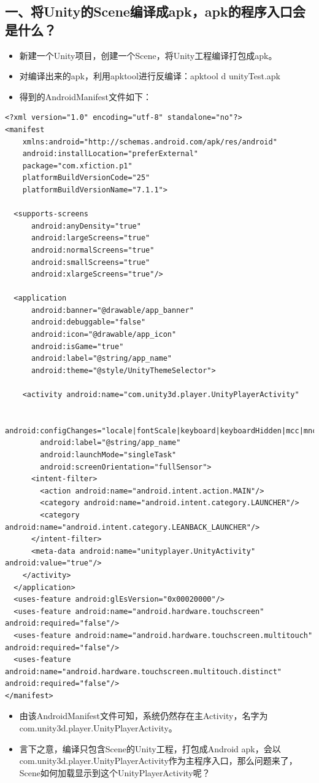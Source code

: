 \documentclass[9pt, b5paper]{article}
\begin{document}
\subsection{一、将Unity的Scene编译成apk，apk的程序入口会是什么？}
\label{sec-2-1}
\begin{itemize}
\item 新建一个Unity项目，创建一个Scene，将Unity工程编译打包成apk。
\item 对编译出来的apk，利用apktool进行反编译：apktool d unityTest.apk
\item 得到的AndroidManifest文件如下：
\end{itemize}
\begin{verbatim}
<?xml version="1.0" encoding="utf-8" standalone="no"?>
<manifest
    xmlns:android="http://schemas.android.com/apk/res/android"
    android:installLocation="preferExternal"
    package="com.xfiction.p1"
    platformBuildVersionCode="25"
    platformBuildVersionName="7.1.1">

  <supports-screens
      android:anyDensity="true"
      android:largeScreens="true"
      android:normalScreens="true"
      android:smallScreens="true"
      android:xlargeScreens="true"/>

  <application
      android:banner="@drawable/app_banner"
      android:debuggable="false"
      android:icon="@drawable/app_icon"
      android:isGame="true"
      android:label="@string/app_name"
      android:theme="@style/UnityThemeSelector">

    <activity android:name="com.unity3d.player.UnityPlayerActivity" 

        android:configChanges="locale|fontScale|keyboard|keyboardHidden|mcc|mnc|navigation|orientation|screenLayout|screenSize|smallestScreenSize|touchscreen|uiMode"
        android:label="@string/app_name"
        android:launchMode="singleTask"
        android:screenOrientation="fullSensor">
      <intent-filter>
        <action android:name="android.intent.action.MAIN"/>
        <category android:name="android.intent.category.LAUNCHER"/>
        <category android:name="android.intent.category.LEANBACK_LAUNCHER"/>
      </intent-filter>
      <meta-data android:name="unityplayer.UnityActivity" android:value="true"/>
    </activity>
  </application>
  <uses-feature android:glEsVersion="0x00020000"/>
  <uses-feature android:name="android.hardware.touchscreen" android:required="false"/>
  <uses-feature android:name="android.hardware.touchscreen.multitouch" android:required="false"/>
  <uses-feature android:name="android.hardware.touchscreen.multitouch.distinct" android:required="false"/>
</manifest>
\end{verbatim}
\begin{itemize}
\item 由该AndroidManifest文件可知，系统仍然存在主Activity，名字为com.unity3d.player.UnityPlayerActivity。
\item 言下之意，编译只包含Scene的Unity工程，打包成Android apk，会以com.unity3d.player.UnityPlayerActivity作为主程序入口，那么问题来了，Scene如何加载显示到这个UnityPlayerActivity呢？
\end{itemize}
\end{document}
